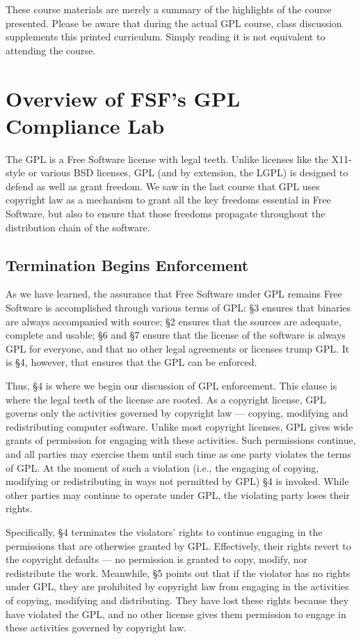 {\bigskip

These course materials are merely a summary of the highlights of the
course presented. Please be aware that during the actual GPL course, class
discussion supplements this printed curriculum. Simply reading it is
not equivalent to attending the course.

\chapter{Overview of FSF's GPL Compliance Lab}

The GPL is a Free Software license with legal teeth. Unlike licenses like
the X11-style or various BSD licenses, GPL (and by extension, the LGPL) is
designed to defend as well as grant freedom. We saw in the last course
that GPL uses copyright law as a mechanism to grant all the key freedoms
essential in Free Software, but also to ensure that those freedoms
propagate throughout the distribution chain of the software.

\section{Termination Begins Enforcement}

As we have learned, the assurance that Free Software under GPL remains
Free Software is accomplished through various terms of GPL: \S 3 ensures
that binaries are always accompanied with source; \S 2 ensures that the
sources are adequate, complete and usable; \S 6 and \S 7 ensure that the
license of the software is always GPL for everyone, and that no other
legal agreements or licenses trump GPL. It is \S 4, however, that ensures
that the GPL can be enforced.

Thus, \S 4 is where we begin our discussion of GPL enforcement. This
clause is where the legal teeth of the license are rooted. As a copyright
license, GPL governs only the activities governed by copyright law ---
copying, modifying and redistributing computer software. Unlike most
copyright licenses, GPL gives wide grants of permission for engaging with
these activities. Such permissions continue, and all parties may exercise
them until such time as one party violates the terms of GPL\@. At the
moment of such a violation (i.e., the engaging of copying, modifying or
redistributing in ways not permitted by GPL) \S 4 is invoked. While other
parties may continue to operate under GPL, the violating party loses their
rights.

Specifically, \S 4 terminates the violators' rights to continue
engaging in the permissions that are otherwise granted by GPL\@.
Effectively, their rights revert to the copyright defaults ---
no permission is granted to copy, modify, nor redistribute the work.
Meanwhile, \S 5 points out that if the violator has no rights under
GPL, they are prohibited by copyright law from engaging in the
activities of copying, modifying and distributing. They have lost
these rights because they have violated the GPL, and no other license
gives them permission to engage in these activities governed by copyright law.

}
